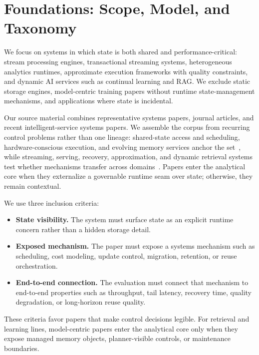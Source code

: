 ﻿\documentclass[manuscript]{acmart}
\begin{document}
\section{Foundations: Scope, Model, and Taxonomy}
\label{sec:foundations}

We focus on systems in which state is both shared and performance-critical: stream processing engines, transactional streaming systems, heterogeneous analytics runtimes, approximate execution frameworks with quality constraints, and dynamic AI services such as continual learning and RAG. We exclude static storage engines, model-centric training papers without runtime state-management mechanisms, and applications where state is incidental.

Our source material combines representative systems papers, journal articles, and recent intelligent-service systems papers. We assemble the corpus from recurring control problems rather than one lineage: shared-state access and scheduling, hardware-conscious execution, and evolving memory services anchor the set~\cite{zhang2024survey,zhang2020hardware,mao2023morphstream,wu2023sentistream,zhang2026flowrag}, while streaming, serving, recovery, approximation, and dynamic retrieval systems test whether mechanisms transfer across domains~\cite{akidau2013millwheel,murray2013naiad,zaharia2013dstreams,akidau2015dataflow,kwon2023pagedattention,agrawal2024sarathi,zheng2023sglang}. Papers enter the analytical core when they externalize a governable runtime seam over state; otherwise, they remain contextual.

We use three inclusion criteria:
\begin{itemize}[leftmargin=*]
\item \textbf{State visibility.} The system must surface state as an explicit runtime concern rather than a hidden storage detail.
\item \textbf{Exposed mechanism.} The paper must expose a systems mechanism such as scheduling, cost modeling, update control, migration, retention, or reuse orchestration.
\item \textbf{End-to-end connection.} The evaluation must connect that mechanism to end-to-end properties such as throughput, tail latency, recovery time, quality degradation, or long-horizon reuse quality.
\end{itemize}
These criteria favor papers that make control decisions legible. For retrieval and learning lines, model-centric papers enter the analytical core only when they expose managed memory objects, planner-visible controls, or maintenance boundaries.
\end{document}
